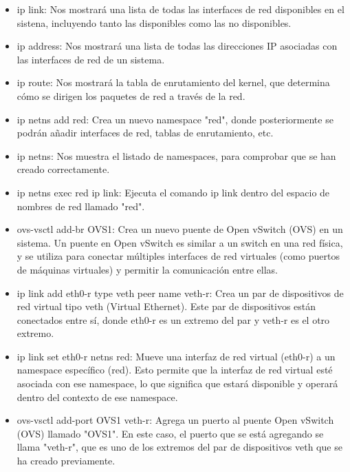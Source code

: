 \documentclass[a4paper, 12pt]{book}
\begin{document}
	\begin{itemize}
		\item ip link: Nos mostrará una lista de todas las interfaces de red disponibles en el sistena, incluyendo tanto las disponibles como las no disponibles.
		
		\item ip address: Nos mostrará una lista de todas las direcciones IP asociadas con las interfaces de red de un sistema.
		
		\item ip route: Nos mostrará la tabla de enrutamiento del kernel, que determina cómo se dirigen los paquetes de red a través de la red.
		
		\item ip netns add red: Crea un nuevo namespace "red", donde posteriormente se podrán añadir interfaces de red, tablas de enrutamiento, etc. 
		
		\item ip netns: Nos muestra el listado de namespaces, para comprobar que se han creado correctamente.
		
		\item ip netns exec red ip link: Ejecuta el comando ip link dentro del espacio de nombres de red llamado "red". 
			
		\item ovs-vsctl add-br OVS1: Crea un nuevo puente de Open vSwitch (OVS) en un sistema. Un puente en Open vSwitch es similar a un switch en una red física, y se utiliza para conectar múltiples interfaces de red virtuales (como puertos de máquinas virtuales) y permitir la comunicación entre ellas. 
				
		\item ip link add eth0-r type veth peer name veth-r:  Crea un par de dispositivos de red virtual tipo veth (Virtual Ethernet). Este par de dispositivos están conectados entre sí, donde eth0-r es un extremo del par y veth-r es el otro extremo. 
		
		\item ip link set eth0-r netns red: Mueve una interfaz de red virtual (eth0-r) a un namespace específico (red). Esto permite que la interfaz de red virtual esté asociada con ese namespace, lo que significa que estará disponible y operará dentro del contexto de ese namespace.
		
		\item ovs-vsctl add-port OVS1 veth-r: Agrega un puerto al puente Open vSwitch (OVS) llamado "OVS1". En este caso, el puerto que se está agregando se llama "veth-r", que es uno de los extremos del par de dispositivos veth que se ha creado previamente.
		

\end{itemize}
\end{document}
